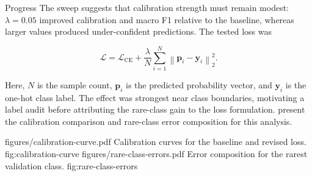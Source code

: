 \documentclass[10pt,a4paper]{article}
\begin{document}
\begin{pppbox}{Progress}
The sweep suggests that calibration strength must remain modest:
$\lambda=0.05$ improved calibration and macro F1 relative to the baseline, whereas
larger values produced under-confident predictions. The tested loss was

\[
    \mathcal{L}
    = \mathcal{L}_{\mathrm{CE}}
    + \frac{\lambda}{N}
      \sum_{i=1}^{N}\left\lVert\mathbf{p}_i-\mathbf{y}_i\right\rVert_2^2.
\]

Here, $N$ is the sample count, $\mathbf{p}_i$ is the predicted probability
vector, and $\mathbf{y}_i$ is the one-hot class label.
The effect was strongest near class boundaries, motivating a label audit
before attributing the rare-class gain to the loss formulation.
 present the calibration
comparison and rare-class error composition for this analysis.

\end{pppbox}


\ReportFigurePair
    {figures/calibration-curve.pdf}
    {Calibration curves for the baseline and revised loss.}
    {fig:calibration-curve}
    {figures/rare-class-errors.pdf}
    {Error composition for the rarest validation class.}
    {fig:rare-class-errors}


\vspace{2mm}
\end{document}
